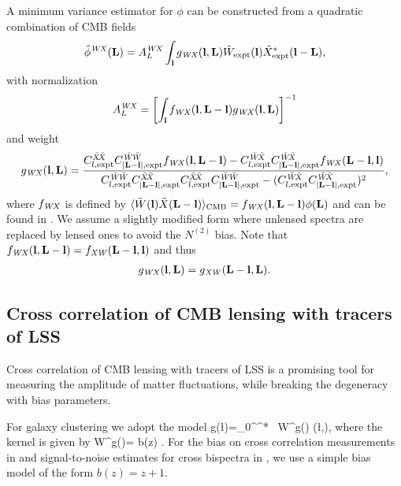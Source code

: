 \documentclass[prd,superscriptaddress,nofootinbib,floatfix,notitlepage]{revtex4-1}
\newcommand{\todo}[1]{{\color{red}{TODO: #1}}}
\begin{document}
A minimum variance estimator for $\phi$ can be constructed from a quadratic combination of CMB fields \cite{Hu0111606}
\begin{equation}
    \label{eq:QuadEsti}
    \hat\phi^{\mathit{WX}}({\bf L}) = A_L^{\mathit{WX}}\int_{\bf l} g_{\mathit{WX}}({\bf l},{\bf L})\tilde W_{\mathrm{expt}}({\bf l})\tilde{X}^*_{\mathrm{expt}}({\bf l}-{\bf L}),
\end{equation}
with normalization
\begin{equation}
\label{eq:24}
  A_L^{\mathit{WX}} = \left[\int_{\bf l} f_{\mathit{WX}}({\bf l},{\bf L}-{\bf l})g_{\mathit{WX}}({\bf l},{\bf L})\right]^{-1}
\end{equation}
and weight
\begin{equation}
\label{eq:25}
g_\WX(\vl,\VL) = \frac{C_{l,\expt}^\tXX C_{|\VL-\vl|,\expt}^\tWW f_\WX(\vl,\VL-\vl) - C_{l,\expt}^\tWX C^\tWX_{|\VL-\vl|,\expt}f_\WX(\VL-\vl,\vl)}{C_{l,\expt}^\tWW C^\tXX_{|\VL-\vl|,\expt}C^\tXX_{l,\expt}C^\tWW_{|\VL-\vl|,\expt} - (C^\tWX_{l,\expt}C^\tWX_{|\VL-\vl|,\expt})^2},
\end{equation}
where $f_{\mathit{WX}}$ is defined by $\langle \tilde W({\bf l})\tilde X({\bf L}-{\bf l})\rangle_\mathrm{CMB}=f_{\mathit{WX}}({\bf l},{\bf L}-{\bf l})\phi({\bf L})$ and can be found in \cite{Hu0111606}. We assume a slightly modified form where unlensed spectra are replaced by lensed ones \cite{hanson1008} to avoid the $N^{(2)}$ bias.  Note that $f_{\mathit{WX}}({\bf l},{\bf L}-{\bf l})=f_\mathit{XW}({\bf L}-{\bf l},{\bf l})$ and thus 
\begin{align}
\label{eq:gSymmetry}
g_{\mathit{WX}}({\bf l},{\bf L})=g_\mathit{XW}({\bf L}-{\bf l},{\bf L}).   
\end{align}


\subsection{Cross correlation of CMB lensing with tracers of LSS}
Cross correlation of CMB lensing with tracers of LSS is a promising tool for measuring the amplitude of matter fluctuations, while breaking the degeneracy with bias parameters. \todo{discuss different tracer samples}

For galaxy clustering we adopt the model 
\beq
g(\l)=\int_0^{\chi^*} \ud\chi \, W^{g}(\chi) \delta(\l,\chi),
\eeq
where the kernel is given by 
\beq
W^{g}(\chi)= b(z)  .
\eeq
For the bias on cross correlation measurements in  and signal-to-noise estimates for cross bispectra in , we use a simple bias model of the form $b(z)=z+1$. \todo{bias model for Fisher forecast}

\todo{Discuss LSST sample and  redshift bins}
\end{document}

